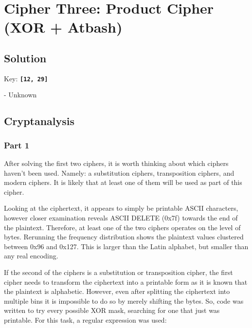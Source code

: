 \documentclass{article}
\begin{document}
\section{Cipher Three: Product Cipher (XOR + Atbash)}

\subsection{Solution}

Key: \textbf{\lstinline{[12, 29]}}


- Unknown

\subsection{Cryptanalysis}

\subsubsection{Part 1}

After solving the first two ciphers, it is worth thinking about which ciphers haven't been used. Namely: a substitution ciphers, transposition ciphers, and modern ciphers. It is likely that at least one of them will be used as part of this cipher.

Looking at the ciphertext, it appears to simply be printable ASCII characters, however closer examination reveals ASCII DELETE (0x7f) towards the end of the plaintext. Therefore, at least one of the two ciphers operates on the level of bytes. Rerunning the frequency distribution shows the plaintext values clustered between 0x96 and 0x127. This is larger than the Latin alphabet, but smaller than any real encoding.

\begin{adjustbox}{width=\textwidth}
\end{adjustbox}

If the second of the ciphers is a substitution or transposition cipher, the first cipher needs to transform the ciphertext into a printable form as it is known that the plaintext is alphabetic. However, even after splitting the ciphertext into multiple bins it is impossible to do so by merely shifting the bytes. So, code was written to try every possible XOR mask, searching for one that just was printable. For this task, a regular expression was used:
\end{document}
